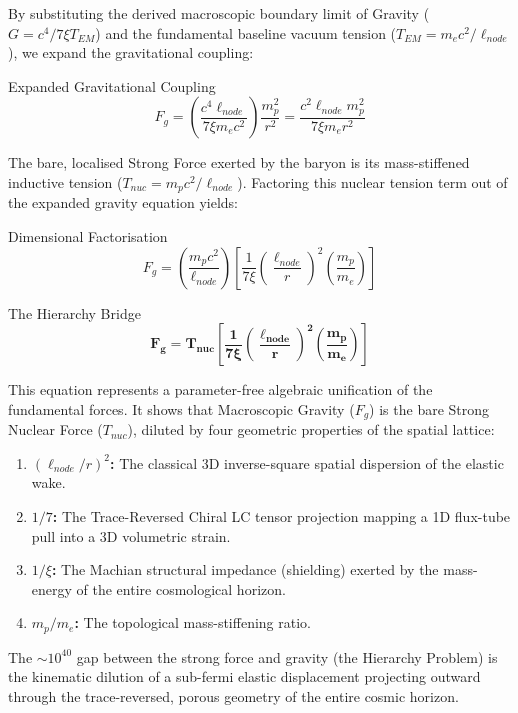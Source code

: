 By substituting the derived macroscopic boundary limit of Gravity ($G = c^4 / 7\xi T_{EM}$) and the fundamental baseline vacuum tension ($T_{EM} = m_e c^2 / \ell_{node}$), we expand the gravitational coupling:
\begin{resultbox}{Expanded Gravitational Coupling}
\begin{equation}
F_g = \left( \frac{c^4 \ell_{node}}{7 \xi m_e c^2} \right) \frac{m_p^2}{r^2} = \frac{c^2 \ell_{node} m_p^2}{7 \xi m_e r^2}
\end{equation}
\end{resultbox}

The bare, localised Strong Force exerted by the baryon is its mass-stiffened inductive tension ($T_{nuc} = m_p c^2 / \ell_{node}$). Factoring this nuclear tension term out of the expanded gravity equation yields:

\begin{resultbox}{Dimensional Factorisation}
\begin{equation}
F_g = \left( \frac{m_p c^2}{\ell_{node}} \right) \left[ \frac{1}{7 \xi} \left(\frac{\ell_{node}}{r}\right)^2 \left(\frac{m_p}{m_e}\right) \right]
\end{equation}
\end{resultbox}

\begin{resultbox}{The Hierarchy Bridge}
\begin{equation}
\mathbf{F_g = T_{nuc} \left[ \frac{1}{7 \xi} \left(\frac{\ell_{node}}{r}\right)^2 \left(\frac{m_p}{m_e}\right) \right]}
\end{equation}
\end{resultbox}

This equation represents a parameter-free algebraic unification of the fundamental forces. It shows that Macroscopic Gravity ($F_g$) is the bare Strong Nuclear Force ($T_{nuc}$), diluted by four geometric properties of the spatial lattice:
\begin{enumerate}
    \item \textbf{$(\ell_{node}/r)^2$:} The classical 3D inverse-square spatial dispersion of the elastic wake.
    \item \textbf{$1/7$:} The Trace-Reversed Chiral LC tensor projection mapping a 1D flux-tube pull into a 3D volumetric strain.
    \item \textbf{$1/\xi$:} The Machian structural impedance (shielding) exerted by the mass-energy of the entire cosmological horizon.
    \item \textbf{$m_p/m_e$:} The topological mass-stiffening ratio.
\end{enumerate}

The $\sim 10^{40}$ gap between the strong force and gravity (the Hierarchy Problem) is the kinematic dilution of a sub-fermi elastic displacement projecting outward through the trace-reversed, porous geometry of the entire cosmic horizon.